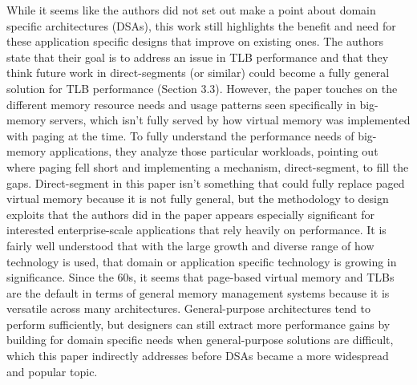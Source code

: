 \documentclass [12pt]{article}
\begin{document}
    While it seems like the authors did not set out make a point about domain specific architectures (DSAs), this work still highlights the benefit and need for these application specific designs that improve on existing ones. The authors state that their goal is to address an issue in TLB performance and that they think future work in direct-segments (or similar) could become a fully general solution for TLB performance (Section 3.3). However, the paper touches on the different memory resource needs and usage patterns seen specifically in big-memory servers, which isn't fully served by how virtual memory was implemented with paging at the time. To fully understand the performance needs of big-memory applications, they analyze those particular workloads, pointing out where paging fell short and implementing a mechanism, direct-segment, to fill the gaps. Direct-segment in this paper isn't something that could fully replace paged virtual memory because it is not fully general, but the methodology to design exploits that the authors did in the paper appears especially significant for interested enterprise-scale applications that rely heavily on performance. It is fairly well understood that with the large growth and diverse range of how technology is used, that domain or application specific technology is growing in significance. Since the 60s, it seems that page-based virtual memory and TLBs are the default in terms of general memory management systems because it is versatile across many architectures. General-purpose architectures tend to perform sufficiently, but designers can still extract more performance gains by building for domain specific needs when general-purpose solutions are difficult, which this paper indirectly addresses before DSAs became a more widespread and popular topic.



 
        
\end{document}
